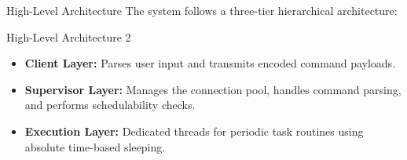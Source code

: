 \begin{frame}{High-Level Architecture}
    The system follows a three-tier hierarchical architecture:
    
    \begin{center}
    \end{center}
\end{frame}

\begin{frame}{High-Level Architecture 2}
    \begin{itemize}
        \item \textbf{Client Layer:} Parses user input and transmits encoded command payloads.
        \item \textbf{Supervisor Layer:} Manages the connection pool, handles command parsing, and performs schedulability checks.
        \item \textbf{Execution Layer:} Dedicated threads for periodic task routines using absolute time-based sleeping.
    \end{itemize}
\end{frame}

